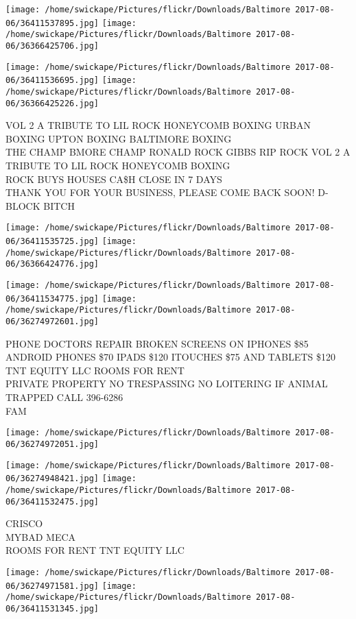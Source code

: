 \documentclass[10pt,letterpaper]{article}
\begin{document}
\texttt{[image: /home/swickape/Pictures/flickr/Downloads/Baltimore 2017-08-06/36411537895.jpg]}
\texttt{[image: /home/swickape/Pictures/flickr/Downloads/Baltimore 2017-08-06/36366425706.jpg]}

\texttt{[image: /home/swickape/Pictures/flickr/Downloads/Baltimore 2017-08-06/36411536695.jpg]}
\texttt{[image: /home/swickape/Pictures/flickr/Downloads/Baltimore 2017-08-06/36366425226.jpg]}

VOL 2 A TRIBUTE TO LIL ROCK HONEYCOMB BOXING URBAN BOXING UPTON BOXING BALTIMORE BOXING\\
THE CHAMP BMORE CHAMP RONALD ROCK GIBBS RIP ROCK VOL 2 A TRIBUTE TO LIL ROCK HONEYCOMB BOXING\\
ROCK BUYS HOUSES CA\$H CLOSE IN 7 DAYS\\
THANK YOU FOR YOUR BUSINESS, PLEASE COME BACK SOON!  D{-}BLOCK BITCH
\pagebreak

\texttt{[image: /home/swickape/Pictures/flickr/Downloads/Baltimore 2017-08-06/36411535725.jpg]}
\texttt{[image: /home/swickape/Pictures/flickr/Downloads/Baltimore 2017-08-06/36366424776.jpg]}

\texttt{[image: /home/swickape/Pictures/flickr/Downloads/Baltimore 2017-08-06/36411534775.jpg]}
\texttt{[image: /home/swickape/Pictures/flickr/Downloads/Baltimore 2017-08-06/36274972601.jpg]}

PHONE DOCTORS REPAIR BROKEN SCREENS ON IPHONES \$85 ANDROID PHONES \$70 IPADS \$120 ITOUCHES \$75 AND TABLETS \$120\\
TNT EQUITY LLC ROOMS FOR RENT\\
PRIVATE PROPERTY NO TRESPASSING NO LOITERING IF ANIMAL TRAPPED CALL 396{-}6286\\
FAM
\pagebreak

\texttt{[image: /home/swickape/Pictures/flickr/Downloads/Baltimore 2017-08-06/36274972051.jpg]}

\vspace{0.25in}
\texttt{[image: /home/swickape/Pictures/flickr/Downloads/Baltimore 2017-08-06/36274948421.jpg]}
\texttt{[image: /home/swickape/Pictures/flickr/Downloads/Baltimore 2017-08-06/36411532475.jpg]}

CRISCO\\
MYBAD MECA\\
ROOMS FOR RENT TNT EQUITY LLC
\pagebreak

\texttt{[image: /home/swickape/Pictures/flickr/Downloads/Baltimore 2017-08-06/36274971581.jpg]}
\texttt{[image: /home/swickape/Pictures/flickr/Downloads/Baltimore 2017-08-06/36411531345.jpg]}
\end{document}
